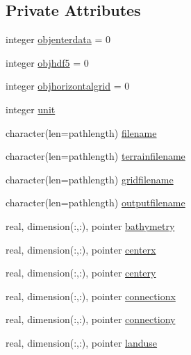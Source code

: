 \subsection*{Private Attributes}
\begin{DoxyCompactItemize}
\item 
integer \mbox{\hyperlink{structmodulewrfformat_1_1t__wrfformat_aa5783c31917a90cfdf41313e989750f9}{objenterdata}} = 0
\item 
integer \mbox{\hyperlink{structmodulewrfformat_1_1t__wrfformat_ae897c6015694a79197617d452bda1e60}{objhdf5}} = 0
\item 
integer \mbox{\hyperlink{structmodulewrfformat_1_1t__wrfformat_a6d656e0d6119b2fefc33423325ea67f6}{objhorizontalgrid}} = 0
\item 
integer \mbox{\hyperlink{structmodulewrfformat_1_1t__wrfformat_a88efc4e08c1b125841a10bd23f792a2c}{unit}}
\item 
character(len=pathlength) \mbox{\hyperlink{structmodulewrfformat_1_1t__wrfformat_aaf8c3b3fb54d4ca90f3cee859b235e29}{filename}}
\item 
character(len=pathlength) \mbox{\hyperlink{structmodulewrfformat_1_1t__wrfformat_af2c4a19ff9bdb0cf7b05918dd002619b}{terrainfilename}}
\item 
character(len=pathlength) \mbox{\hyperlink{structmodulewrfformat_1_1t__wrfformat_a57b8b3914fad1cbbd98873f0527b2d2b}{gridfilename}}
\item 
character(len=pathlength) \mbox{\hyperlink{structmodulewrfformat_1_1t__wrfformat_a288bf183c22d32956b9c6e8be7745769}{outputfilename}}
\item 
real, dimension(\+:,\+:), pointer \mbox{\hyperlink{structmodulewrfformat_1_1t__wrfformat_ad9e539808c4addaaa994bf4ea95ce393}{bathymetry}}
\item 
real, dimension(\+:,\+:), pointer \mbox{\hyperlink{structmodulewrfformat_1_1t__wrfformat_aed1a1b70da29bc4e9375cd0689ec5fc5}{centerx}}
\item 
real, dimension(\+:,\+:), pointer \mbox{\hyperlink{structmodulewrfformat_1_1t__wrfformat_a3673dc6b28753c66dd22db793bf24ef5}{centery}}
\item 
real, dimension(\+:,\+:), pointer \mbox{\hyperlink{structmodulewrfformat_1_1t__wrfformat_abacc626e96eb594466e587f236cc89a2}{connectionx}}
\item 
real, dimension(\+:,\+:), pointer \mbox{\hyperlink{structmodulewrfformat_1_1t__wrfformat_a470aa238915fad5a4126599a2b1f72d4}{connectiony}}
\item 
real, dimension(\+:,\+:), pointer \mbox{\hyperlink{structmodulewrfformat_1_1t__wrfformat_ae1481977befc2f3cc8ee21e3dab1b77b}{landuse}}

\end{DoxyCompactItemize}
